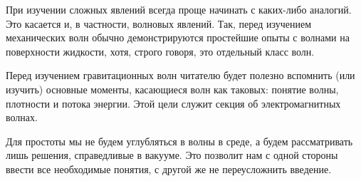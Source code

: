 \documentclass[\docroot/reports/lectures-draft/report.tex]{subfiles}
\begin{document}
\onlyinsubfile{\tableofcontents}

При изучении сложных явлений всегда проще начинать с каких-либо аналогий. Это касается и, в частности, волновых явлений. Так, перед изучением механических волн обычно демонстрируются простейшие опыты с волнами на поверхности жидкости, хотя, строго говоря, это отдельный класс волн.

Перед изучением гравитационных волн читателю будет полезно вспомнить (или изучить) основные моменты, касающиеся волн как таковых: понятие волны, плотности и потока энергии. Этой цели служит секция об электромагнитных волнах.

Для простоты мы не будем углубляться в волны в среде, а будем рассматривать лишь решения, справедливые в вакууме. Это позволит нам с одной стороны ввести все необходимые понятия, с другой же не переусложнить введение.

\end{document}

